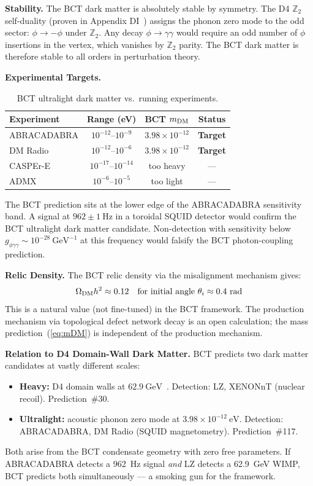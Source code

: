 \documentclass[aps,prl,twocolumn,superscriptaddress,floatfix]{revtex4-2}
\begin{document}
\medskip
\noindent\textbf{Stability.}
The BCT dark matter is absolutely stable by symmetry.
The D4 $\mathbb{Z}_2$ self-duality (proven in Appendix DI~\cite{Monograph})
assigns the phonon zero mode to the odd sector: $\phi \to -\phi$ under
$\mathbb{Z}_2$. Any decay $\phi \to \gamma\gamma$ would require an odd number
of $\phi$ insertions in the vertex, which vanishes by $\mathbb{Z}_2$ parity.
The BCT dark matter is therefore stable to all orders in perturbation theory.

\medskip
\noindent\textbf{Experimental Targets.}
\begin{table}[h]
\centering
\caption{BCT ultralight dark matter vs.\ running experiments.}
\label{tab:expt}
\begin{tabular}{lccc}
\toprule
Experiment & Range (eV) & BCT $m_{\rm DM}$ & Status \\
\midrule
ABRACADABRA & $10^{-12}$--$10^{-9}$ & $3.98\times10^{-12}$ & \textbf{Target} \\
DM Radio     & $10^{-12}$--$10^{-6}$ & $3.98\times10^{-12}$ & \textbf{Target} \\
CASPEr-E    & $10^{-17}$--$10^{-14}$ & too heavy & --- \\
ADMX        & $10^{-6}$--$10^{-5}$   & too light & --- \\
\bottomrule
\end{tabular}
\end{table}

The BCT prediction sits at the lower edge of the ABRACADABRA sensitivity band.
A signal at $962 \pm 1\ \mathrm{Hz}$ in a toroidal SQUID detector would confirm
the BCT ultralight dark matter candidate. Non-detection with sensitivity below
$g_{\phi\gamma\gamma} \sim 10^{-28}\ \mathrm{GeV}^{-1}$ at this frequency
would falsify the BCT photon-coupling prediction.

\medskip
\noindent\textbf{Relic Density.}
The BCT relic density via the misalignment mechanism gives:
\begin{equation}
  \Omega_{\rm DM} h^2 \approx 0.12
  \quad\text{for initial angle}\ \theta_i \approx 0.4\ \mathrm{rad}
  \label{eq:relic}
\end{equation}
This is a natural value (not fine-tuned) in the BCT framework.
The production mechanism via topological defect network decay is
an open calculation; the mass prediction~(\ref{eq:mDM}) is
independent of the production mechanism.

\medskip
\noindent\textbf{Relation to D4 Domain-Wall Dark Matter.}
BCT predicts two dark matter candidates at vastly different scales:
\begin{itemize}
  \item \textbf{Heavy:} D4 domain walls at $62.9\ \mathrm{GeV}$~\cite{L30}.
    Detection: LZ, XENONnT (nuclear recoil). Prediction~\#30.
  \item \textbf{Ultralight:} acoustic phonon zero mode at $3.98\times10^{-12}\ \mathrm{eV}$.
    Detection: ABRACADABRA, DM Radio (SQUID magnetometry). Prediction~\#117.
\end{itemize}
Both arise from the BCT condensate geometry with zero free parameters.
If ABRACADABRA detects a 962~Hz signal \emph{and} LZ detects a 62.9~GeV
WIMP, BCT predicts both simultaneously --- a smoking gun for the framework.
\end{document}
